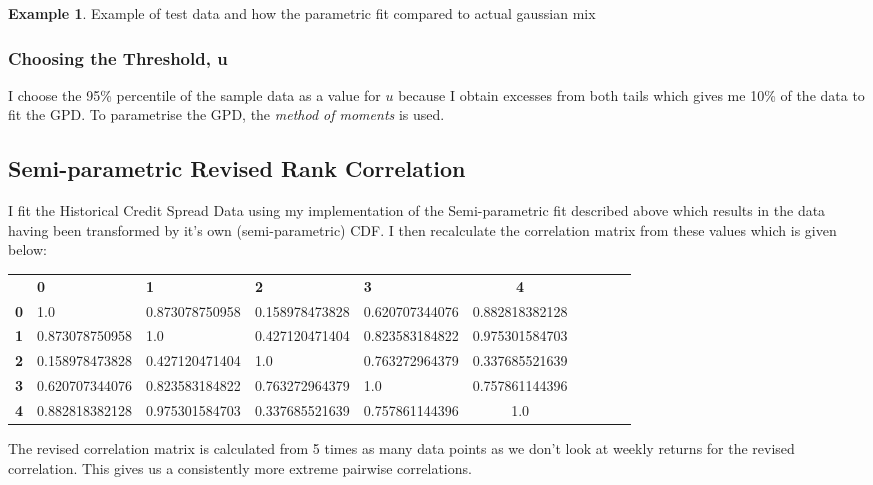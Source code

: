 \documentclass{report}
\theoremstyle{plain}
\theoremstyle{definition}
\newtheorem{exmp}[thm]{Example} %
\begin{document}
\begin{exmp}
	Example of test data and how the parametric fit compared to actual gaussian mix
\end{exmp}

\subsubsection{Choosing the Threshold, u}
I choose the 95\% percentile of the sample data as a value for $u$ because I obtain excesses from both tails which gives me 10\% of the data to fit the GPD. To parametrise the GPD, the \emph{method of moments} is used.


\subsection{Semi-parametric Revised Rank Correlation}

I fit the Historical Credit Spread Data using my implementation of the Semi-parametric fit described above which results in the data having been transformed by it's own (semi-parametric) CDF. I then recalculate the correlation matrix from these values which is given below:

\begin{center}
	\begin{tabular}{|l|l|l|l|l|c|c|c|c|c|}
		\hline
		& \textbf{0} & \textbf{1} & \textbf{2} & \textbf{3} & \textbf{4}\\\hhline{|=|=|=|=|=|=|}
		\textbf{0} & 1.0 & 0.873078750958 & 0.158978473828 & 0.620707344076 & 0.882818382128\\
		\textbf{1} & 0.873078750958 & 1.0 & 0.427120471404 & 0.823583184822 & 0.975301584703\\
		\textbf{2} & 0.158978473828 & 0.427120471404 & 1.0 & 0.763272964379 & 0.337685521639\\
		\textbf{3} & 0.620707344076 & 0.823583184822 & 0.763272964379 & 1.0 & 0.757861144396\\
		\textbf{4} & 0.882818382128 & 0.975301584703 & 0.337685521639 & 0.757861144396 & 1.0\\
		\hline
	\end{tabular}
\end{center}

The revised correlation matrix is calculated from 5 times as many data points as we don't look at weekly returns for the revised correlation. This gives us a consistently more extreme pairwise correlations.\\
\end{document}
